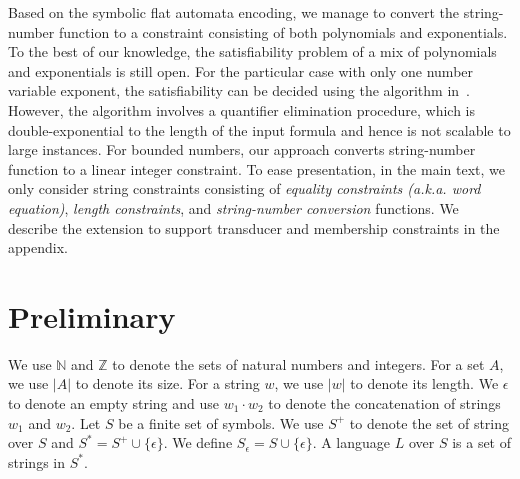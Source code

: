 \documentclass{llncs}
\begin{document}
Based on the symbolic flat automata encoding, we manage to convert the 
string-number function to a constraint consisting of both 
polynomials and exponentials. To the best of our knowledge, the satisfiability 
problem of a mix of polynomials and exponentials is still open. For the 
particular case with only one number variable exponent, the satisfiability can 
be decided using the algorithm in~\cite{POPL2019}. However, the algorithm involves a quantifier elimination procedure, which is double-exponential to the length of the input formula and hence is not scalable to large instances.   For bounded numbers, our approach converts string-number function to a linear integer constraint.
To ease presentation, in the main text, we only consider string constraints consisting of \emph{equality constraints (a.k.a. word equation)}, \emph{length constraints}, and \emph{string-number conversion} functions. We describe the extension to support transducer and membership constraints in the appendix. 









\section{Preliminary} \label{section:preliminary}
We use $\mathbb{N}$ and $\mathbb{Z}$ to denote the sets of natural numbers and 
integers. For a set $A$, we use $|A|$ to denote its size. For a string $w$, we 
use $|w|$ to denote its length. We $\epsilon$ to denote an empty string and use $w_1\cdot w_2$ to denote the concatenation of strings $w_1$ and $w_2$. Let $S$ be a finite set of symbols. We use $S^+$ to denote the set of string over $S$ and $S^* = S^+\cup \{\epsilon\}$. We define $S_\epsilon =S\cup\{\epsilon\}$. A language 
$L$ over $S$ is a set of strings in $S^*$. 
\end{document}
